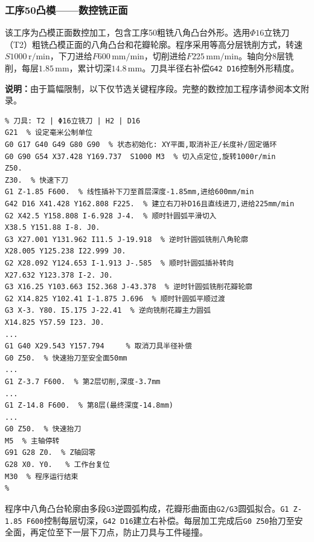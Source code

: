 \documentclass{xautCADreport}
\begin{document}
\subsubsection{工序50凸模——数控铣正面}

该工序为凸模正面数控加工，包含工序\cite{ref:wang2013,ref:li2019}50粗铣八角凸台外形。选用$\Phi16$立铣刀（T2）粗铣凸模正面的八角凸台和花瓣轮廓。程序采用等高分层铣削方式，转速$S1000\,\mathrm{r/min}$，下刀进给$F600\,\mathrm{mm/min}$，切削进给$F225\,\mathrm{mm/min}$。轴向分8层铣削，每层$1.85\,\mathrm{mm}$，累计切深$14.8\,\mathrm{mm}$。刀具半径右补偿\texttt{G42 D16}控制外形精度。

\noindent\textbf{说明：}由于篇幅限制，以下仅节选关键程序段。完整的数控加工程序请参阅本文附录。

\begin{lstlisting}[caption={工序50凹模粗铣型腔程序（节选）}]
% 程序名: 工序50-凹模 (粗铣正面八角型腔)
% 刀具: T2 | Φ16立铣刀 | H2 | D16
G21  % 设定毫米公制单位
G0 G17 G40 G49 G80 G90  % 状态初始化: XY平面,取消补正/长度补/固定循环
G0 G90 G54 X37.428 Y169.737  S1000 M3  % 切入点定位,旋转1000r/min
Z50.
Z30.  % 快速下刀
G1 Z-1.85 F600.  % 线性插补下刀至首层深度-1.85mm,进给600mm/min
G42 D16 X41.428 Y162.808 F225.  % 建立右刀补D16且直线进刀,进给225mm/min
G2 X42.5 Y158.808 I-6.928 J-4.  % 顺时针圆弧平滑切入
X38.5 Y151.88 I-8. J0.
G3 X27.001 Y131.962 I11.5 J-19.918  % 逆时针圆弧铣削八角轮廓
X28.005 Y125.238 I22.999 J0.
G2 X28.092 Y124.653 I-1.913 J-.585  % 顺时针圆弧插补转向
X27.632 Y123.378 I-2. J0.
G3 X16.25 Y103.663 I52.368 J-43.378  % 逆时针圆弧铣削花瓣轮廓
G2 X14.825 Y102.41 I-1.875 J.696  % 顺时针圆弧平顺过渡
G3 X-3. Y80. I5.175 J-22.41  % 逆向铣削花瓣主力圆弧
X14.825 Y57.59 I23. J0.
...
G1 G40 X29.543 Y157.794     % 取消刀具半径补偿
G0 Z50.  % 快速抬刀至安全面50mm
...
G1 Z-3.7 F600.  % 第2层切削,深度-3.7mm
...
G1 Z-14.8 F600.  % 第8层(最终深度-14.8mm)
...
G0 Z50.  % 快速抬刀
M5  % 主轴停转
G91 G28 Z0.  % Z轴回零
G28 X0. Y0.   % 工作台复位
M30  % 程序运行结束
%
\end{lstlisting}

程序中八角凸台轮廓由多段\texttt{G3}逆圆弧构成，花瓣形曲面由\texttt{G2/G3}圆弧拟合。\texttt{G1 Z-1.85 F600}控制每层切深，\texttt{G42 D16}建立右补偿。每层加工完成后\texttt{G0 Z50}抬刀至安全面，再定位至下一层下刀点，防止刀具与工件碰撞。


\newpage
\end{document}
